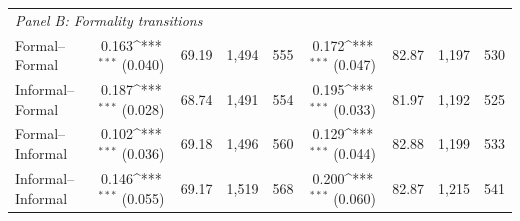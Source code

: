 \documentclass[aspectratio=169]{beamer}
\newcommand{\sym}[1]{\ifmmode^{#1}\else\(^{#1}\)\fi}
\begin{document}
\begin{frame}[noframenumbering]
\begin{center}
\begin{tabular}{lcccccccc}
        \midrule
        \multicolumn{9}{l}{\textit{Panel B: Formality transitions}} \\
        Formal--Formal                  
        & 0.163\sym{***} (0.040) & 69.19 & 1,494 & 555
        & 0.172\sym{***} (0.047) & 82.87 & 1,197 & 530 \\
        Informal--Formal                
        & 0.187\sym{***} (0.028) & 68.74 & 1,491 & 554
        & 0.195\sym{***} (0.033) & 81.97 & 1,192 & 525 \\
        Formal--Informal                
        & 0.102\sym{***} (0.036) & 69.18 & 1,496 & 560
        & 0.129\sym{***} (0.044) & 82.88 & 1,199 & 533 \\
        Informal--Informal              
        & 0.146\sym{***} (0.055) & 69.17 & 1,519 & 568
        & 0.200\sym{***} (0.060) & 82.87 & 1,215 & 541 \\
        
        \bottomrule
    \end{tabular}
\end{center}

\hyperlink{robustness}{}

\end{frame}

\end{document}
